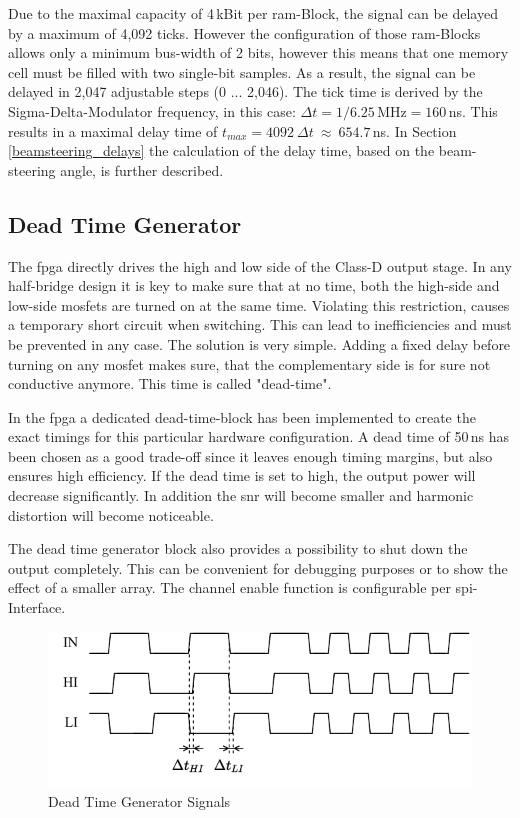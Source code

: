 Due to the maximal capacity of 4\,kBit per \acrshort{ram}-Block, the signal can be delayed by a maximum of 4,092 ticks. However the configuration of those \acrshort{ram}-Blocks allows only a minimum bus-width of 2 bits, however this means that one memory cell must be filled with two single-bit samples. As a result, the signal can be delayed in 2,047 adjustable steps (0 ... 2,046). The tick time is derived by the Sigma-Delta-Modulator frequency, in this case: \mbox{$\Delta t = 1/6.25$\,MHz$ = 160$\,ns}. This results in a maximal delay time of \mbox{$t_{max} = 4092\ \Delta t \ \approx \ 654.7\,$ns}. In Section \ref{beamsteering_delays} the calculation of the delay time, based on the beam-steering angle, is further described.


\subsection{Dead Time Generator}
The \acrshort{fpga} directly drives the high and low side of the Class-D output stage. In any half-bridge design it is key to make sure that at no time, both the high-side and low-side \acrshort{mosfet}s are turned on at the same time. Violating this restriction, causes a temporary short circuit when switching. This can lead to inefficiencies and must be prevented in any case. The solution is very simple. Adding a fixed delay before turning on any \acrshort{mosfet} makes sure, that the complementary side is for sure not conductive anymore. This time is called "dead-time".

In the \acrshort{fpga} a dedicated dead-time-block has been implemented to create the exact timings for this particular hardware configuration. A dead time of 50\,ns has been chosen as a good trade-off since it leaves enough timing margins, but also ensures high efficiency. If the dead time is set to high, the output power will decrease significantly. In addition the \acrshort{snr} will become smaller and harmonic distortion will become noticeable.

The dead time generator block also provides a possibility to shut down the output completely. This can be convenient for debugging purposes or to show the effect of a smaller array. The channel enable function is configurable per \acrshort{spi}-Interface.

\bigskip
\begin{figure}[h!]
    \centering
    \includegraphics[width=\textwidth]{images/4_Design/FPGA/Deadtime-generator.pdf}
    \caption{Dead Time Generator Signals}
    \label{4_fig:fpga_dead_time_generator}
\end{figure}

